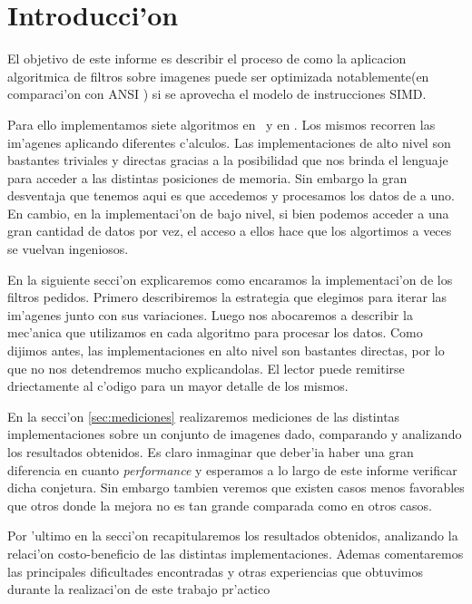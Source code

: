 \section{Introducci'on}

El objetivo de este informe es describir el proceso de como la aplicacion algoritmica de filtros sobre imagenes
puede ser optimizada notablemente(en comparaci'on con ANSI \C) si se aprovecha el modelo de instrucciones SIMD. 

Para ello implementamos siete algoritmos en \C\ y en \ass. Los mismos recorren las im'agenes aplicando diferentes c'alculos. Las implementaciones de alto nivel son bastantes triviales y directas gracias a la posibilidad que nos brinda el lenguaje para acceder a las distintas posiciones de memoria. Sin embargo la gran desventaja que tenemos aqui es que accedemos y procesamos los datos de a uno. En cambio, en la implementaci'on de bajo nivel, si bien podemos acceder a una gran cantidad de datos por vez, el acceso a ellos hace que los algortimos a veces se vuelvan ingeniosos. 

En la siguiente secci'on explicaremos como encaramos la implementaci'on de los filtros pedidos. Primero describiremos la estrategia que elegimos para iterar las im'agenes junto con sus variaciones. Luego nos abocaremos a describir la mec'anica que utilizamos en cada algoritmo para procesar los datos. Como dijimos antes, las implementaciones en alto nivel son bastantes directas, por lo que no nos detendremos mucho explicandolas. El lector puede remitirse driectamente al c'odigo para un mayor detalle de los mismos.

En la secci'on \ref{sec:mediciones} realizaremos mediciones de las distintas implementaciones sobre un conjunto de imagenes dado, comparando y analizando los resultados obtenidos. Es claro inmaginar que deber'ia haber una  gran diferencia en cuanto \textit{performance} y esperamos a lo largo de este informe verificar dicha conjetura. Sin embargo tambien veremos que existen casos menos favorables que otros donde la mejora no es tan grande comparada como en otros casos. 

Por 'ultimo en la secci'on \label{sec:conclusiones} recapitularemos los resultados obtenidos, analizando la relaci'on costo-beneficio de las distintas implementaciones. Ademas comentaremos las principales dificultades encontradas y otras experiencias que obtuvimos durante la realizaci'on de este trabajo pr'actico

\nopagebreak[4]
